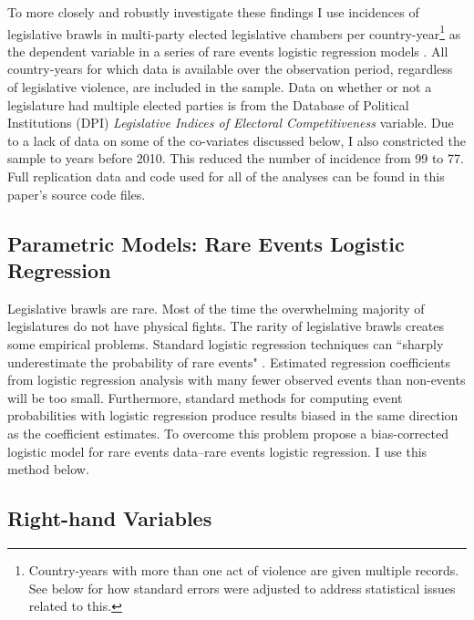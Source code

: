 \documentclass[a4paper]{article}\usepackage[]{graphicx}\usepackage[]{color}
\begin{document}
To more closely and robustly investigate these findings I use incidences of legislative brawls in multi-party elected legislative chambers per country-year\footnote{Country-years with more than one act of violence are given multiple records. See below for how standard errors were adjusted to address statistical issues related to this.} as the dependent variable in a series of rare events logistic regression models \citep{KingRareEvents2001, KingRareEventsPA2001}. All country-years for which data is available over the observation period, regardless of legislative violence, are included in the sample. Data on whether or not a legislature had multiple elected parties is from the Database of Political Institutions (DPI) \citep[updated to 2010]{DPI2001} {\emph{Legislative Indices of Electoral Competitiveness}} variable. Due to a lack of data on some of the co-variates discussed below, I also constricted the sample to years before 2010. This reduced the number of incidence from 99 to 77. Full replication data and code used for all of the analyses can be found in this paper's source code files.

\subsection{Parametric Models: Rare Events Logistic Regression}

Legislative brawls are rare. Most of the time the overwhelming majority of legislatures do not have physical fights. The rarity of legislative brawls creates some empirical problems. Standard logistic regression techniques can ``sharply underestimate the probability of rare events" \cite[137]{KingRareEventsPA2001}. Estimated regression coefficients from logistic regression analysis with many fewer observed events than non-events will be too small. Furthermore, standard methods for computing event probabilities with logistic regression produce results biased in the same direction as the coefficient estimates. To overcome this problem \cite{KingRareEvents2001,KingRareEventsPA2001} propose a bias-corrected logistic model for rare events data--rare events logistic regression. I use this method below.

\subsection{Right-hand Variables}
\end{document}
